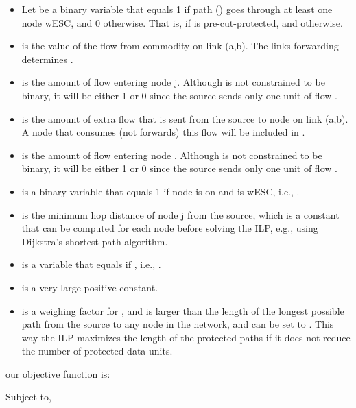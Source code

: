 \documentclass[conference]{IEEEtran}
\begin{document}
\begin{itemize}
\item Let  be a binary variable that equals 1 if path  () goes through at least one node wESC, and 0 otherwise. That is,  if  is pre-cut-protected, and  otherwise.
\item  is the value of the flow from commodity  on link (a,b). The links forwarding  determines .
\item  is the amount of flow  entering node j. Although  is not constrained to be binary, it will be either 1 or 0 since the source sends only one unit of flow .
\item  is the amount of extra flow  that is sent from the source to node  on link (a,b). A node that consumes (not forwards) this flow will be included in . 
\item  is the amount of flow  entering node . Although  is not constrained to be binary, it will be either 1 or 0 since the source sends only one unit of flow .
\item  is a binary variable that equals 1 if node  is on  and is wESC, i.e., .
\item  is the minimum hop distance of node j from the source, which is a constant that can be computed for each node before solving the ILP, e.g., using Dijkstra's shortest path algorithm. 
\item  is a variable that equals  if , i.e., .
\item  is a very large positive constant. 
\item  is a weighing factor for , and is larger than the length of the longest possible path from the source to any node in the network, and can be set to . This way the ILP maximizes the length of the protected paths if it does not reduce the number of protected data units.
\end{itemize}

our objective function is:


Subject to,
\end{document}
